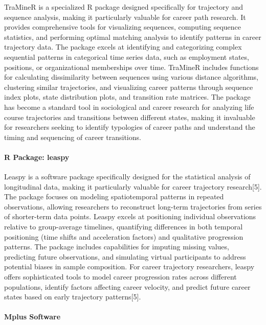 \documentclass[./main.tex]{subfiles}
\begin{document}
TraMineR is a specialized R package designed specifically for trajectory
and sequence analysis, making it particularly valuable for career path
research. It provides comprehensive tools for visualizing sequences,
computing sequence statistics, and performing optimal matching analysis
to identify patterns in career trajectory data. The package excels at
identifying and categorizing complex sequential patterns in categorical
time series data, such as employment states, positions, or
organizational memberships over time. TraMineR includes functions for
calculating dissimilarity between sequences using various distance
algorithms, clustering similar trajectories, and visualizing career
patterns through sequence index plots, state distribution plots, and
transition rate matrices. The package has become a standard tool in
sociological and career research for analyzing life course trajectories
and transitions between different states, making it invaluable for
researchers seeking to identify typologies of career paths and
understand the timing and sequencing of career transitions.

\paragraph{R Package: leaspy}\label{r-package-leaspy}

Leaspy is a software package specifically designed for the statistical
analysis of longitudinal data, making it particularly valuable for
career trajectory research{[}5{]}. The package focuses on modeling
spatiotemporal patterns in repeated observations, allowing researchers
to reconstruct long-term trajectories from series of shorter-term data
points. Leaspy excels at positioning individual observations relative to
group-average timelines, quantifying differences in both temporal
positioning (time shifts and acceleration factors) and qualitative
progression patterns. The package includes capabilities for imputing
missing values, predicting future observations, and simulating virtual
participants to address potential biases in sample composition. For
career trajectory researchers, leaspy offers sophisticated tools to
model career progression rates across different populations, identify
factors affecting career velocity, and predict future career states
based on early trajectory patterns{[}5{]}.

\paragraph{Mplus Software}\label{mplus-software}
\end{document}
